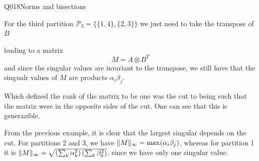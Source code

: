 \begin{entry}{Q018}{Norms and bisections}
\begin{solution}[a]
For the third partition $\mathcal{P}_3=\{\{1,4\},\{2,3\}\}$ we just need to take the transpose of $B$
\begin{center}
\end{center}
leading to a matrix 
\begin{equation}
    M = A\otimes B^T
\end{equation}
and since the singular values are invariant to the transpose, we still have that the singualr values of $M$ are products $\alpha_i\beta_j$.

Which defined the rank of the matrix to be one was the cut to being such that the matrix were in the opposite sides of the cut. One can see that this is generazible. 

\end{solution}

\begin{solution}[b]
From the previous example, it is clear that the largest singular depends on the cut. For partitions 2 and 3, we have $\lVert M\rVert_{\infty}=\max(\alpha_i\beta_j)$, whereas for partition 1 it is $\lVert M\rVert_{\infty}=\sqrt{\left(\sum_k \alpha_k^2\right) \left(\sum_k \beta_k^2\right) }$, since we have only one singular value.
\end{solution}



\end{entry}
